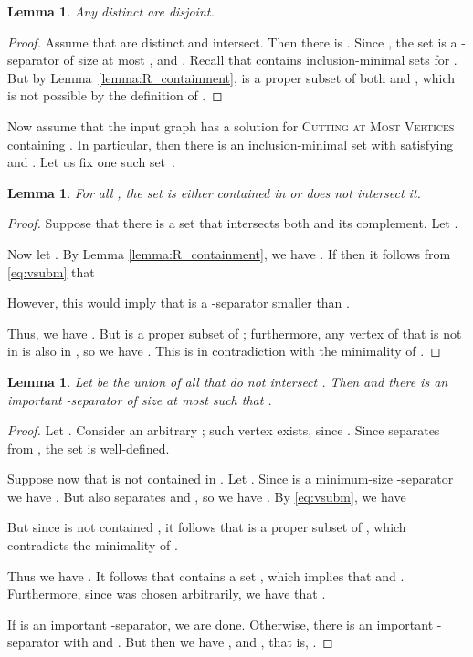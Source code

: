 \documentclass[a4paper,11pt]{article}
\newtheorem{lemma}[theorem]{Lemma}
\theoremstyle{definition}
\theoremstyle{remark}
\begin{document}
\begin{lemma}\label{lemma:R_disjoint}
Any distinct  are disjoint.
\end{lemma}

\begin{proof}
Assume that  are distinct and intersect. Then there is .
Since , the set  is a -separator of size at most , and .
Recall that  contains inclusion-minimal sets  for . 
But by Lemma~\ref{lemma:R_containment},   is a proper subset of both  and , which is not possible by the definition of .
\end{proof}

Now assume that the input graph  has a solution for \textsc{Cutting at Most   Vertices} containing . In particular, then there is an inclusion-minimal set  with  satisfying  and . Let us fix one such set~.

\begin{lemma}\label{lemma:R_intersects_U}
For all , the set  is either contained in  or does not intersect it.
\end{lemma}

\begin{proof}
Suppose that there is a set  that intersects both  and its complement. Let .

Now let . By Lemma \ref{lemma:R_containment}, we have . 
If  then it follows from \eqref{eq:vsubm} that

However, this would imply that  is a -separator smaller than .

Thus, we have . But  is a proper subset of ; furthermore, any vertex of  that is not in  is also in , so we have . This is in contradiction with the minimality of .
\end{proof}

\begin{lemma}\label{lemma:finding_solution}
Let  be the union of all  that do not intersect . Then  and there is an important -separator  of size at most  such that .
\end{lemma}

\begin{proof}
Let . Consider an arbitrary ; such vertex exists, since . Since  separates  from , the set  is well-defined.

Suppose now that  is not contained in . Let . Since  is a minimum-size -separator we have . But  also separates  and , so we have . By \eqref{eq:vsubm}, we have

But since  is not contained , it follows that  is a proper subset of , which contradicts the minimality of .

Thus we have . It follows that  contains a set , which implies that  and . Furthermore, since  was chosen arbitrarily, we have that .

If  is an important -separator, we are done. Otherwise, there is an important -separator  with  and . But then we have , and , that is, .
\end{proof}
\end{document}
